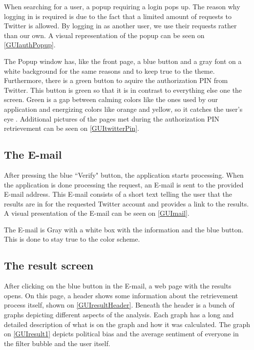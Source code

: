 When searching for a user, a popup requiring a login pops up. The reason why
logging in is required is due to the fact that a limited amount of requests to
Twitter is allowed. By logging in as another user, we use their requests rather
than our own. A visual representation of the popup can be seen on
\autoref{GUIauthPopup}.


The Popup window has, like the front page, a blue button and a gray font on a
white background for the same reasons and to keep true to the theme.
Furthermore, there is a green button to aquire the authorization PIN from
Twitter. This button is green so that it is in contrast to everything else one
the screen. Green is a gap between calming colors like the ones used by our
application and energizing colors like orange and yellow, so it catches the
user's eye \citep[p. 60]{WebUI}. Additional pictures of the pages met during the
authorization PIN retrievement can be seen on \autoref{GUItwitterPin}.

\subsection{The E-mail}
After pressing the blue ``Verify" button, the application starts processing.
When the application is done processing the request, an E-mail is sent to the provided E-mail address. This E-mail consists of a short text telling the user
that the results are in for the requested Twitter account and provides a link to
the results.
A visual presentation of the E-mail can be seen on \autoref{GUImail}.


The E-mail is Gray with a white box with the information and the blue button.
This is done to stay true to the color scheme. 

\subsection{The result screen}
After clicking on the blue button in the E-mail, a web page with the results
opens. On this page, a header shows some information about the retrievement
process itself, shown on \autoref{GUIresultHeader}. Beneath
the header is a bunch of graphs depicting different aspects of the analysis.
Each graph has a long and detailed description of what is on the graph and how
it was calculated. The graph on \autoref{GUIresult1} depicts political bias and
the average sentiment of everyone in the filter bubble and the user itself. 

